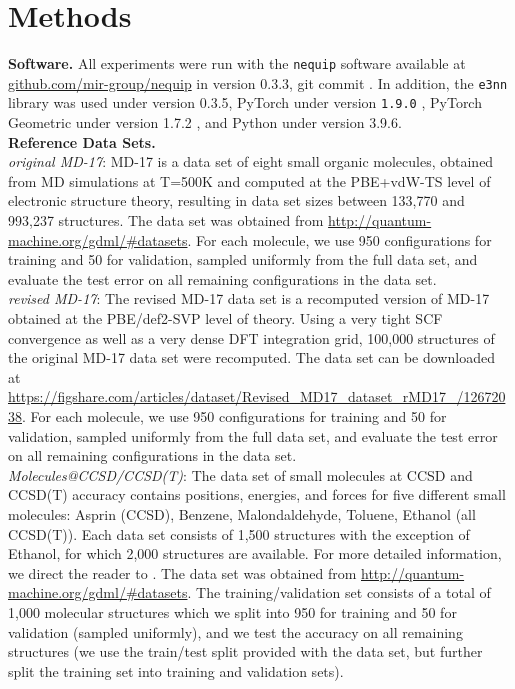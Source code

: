 \documentclass[11pt]{article}
\begin{document}
\section{Methods}

\textbf{Software.} All experiments were run with the \texttt{nequip} software available at \url{github.com/mir-group/nequip} in version 0.3.3, git commit \texttt{}. In addition, the \texttt{e3nn} library \cite{mario_geiger_2021_4735637} was used under version 0.3.5, PyTorch under version \texttt{1.9.0} \cite{paszke2019pytorch}, PyTorch Geometric under version 1.7.2 \cite{fey2019fast}, and Python under version 3.9.6.\\

\textbf{Reference Data Sets.} \\

\textit{original MD-17}: MD-17 \cite{chmiela2017machine, schutt2017quantum, sgdml} is a data set of eight small organic molecules, obtained from MD simulations at T=500K and computed at the PBE+vdW-TS level of electronic structure theory, resulting in data set sizes between 133,770 and 993,237 structures. The data set was obtained from \url{http://quantum-machine.org/gdml/#datasets}. For each molecule, we use 950 configurations for training and 50 for validation, sampled uniformly from the full data set, and evaluate the test error on all remaining configurations in the data set. \\

\textit{revised MD-17}: The revised MD-17 data set is a recomputed version of MD-17 obtained at the PBE/def2-SVP level of theory. Using a very tight SCF convergence as well as a very dense DFT integration grid, 100,000 structures \cite{christensen2020role} of the original MD-17 data set were recomputed. The data set can be downloaded at \url{https://figshare.com/articles/dataset/Revised_MD17_dataset_rMD17_/12672038}. For each molecule, we use 950 configurations for training and 50 for validation, sampled uniformly from the full data set, and evaluate the test error on all remaining configurations in the data set.\\

\textit{Molecules@CCSD/CCSD(T)}: The data set of small molecules at CCSD and CCSD(T) accuracy \cite{sgdml} contains positions, energies, and forces for five different small molecules: Asprin (CCSD), Benzene, Malondaldehyde, Toluene, Ethanol (all CCSD(T)). Each data set consists of 1,500 structures with the exception of Ethanol, for which 2,000 structures are available. For more detailed information, we direct the reader to \cite{sgdml}. The data set was obtained from \url{http://quantum-machine.org/gdml/#datasets}. The training/validation set consists of a total of 1,000 molecular structures which we split into 950 for training and 50 for validation (sampled uniformly), and we test the accuracy on all remaining structures (we use the train/test split provided with the data set, but further split the training set into training and validation sets).  \\
\end{document}
